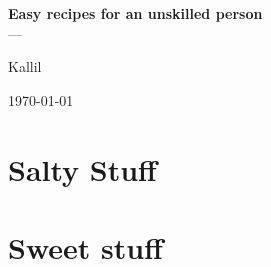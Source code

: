 \documentclass[a4paper, 12pt]{article}
\begin{document}

\begin{titlepage}
	\begin{center}
	

		\textbf{\Large{Easy recipes for an unskilled person}}\\
		\large{---}\\ 
		\vspace{15pt}
        \vspace{95pt}
		\vspace{3,5cm}
	\end{center}
	
	\begin{flushleft}
		\begin{tabbing}
			Kallil\\
	\end{tabbing}
 \end{flushleft}
	\vspace{1cm}
	
	\begin{center}
		\vspace{\fill}
			\today
			\end{center}
\end{titlepage}


\newpage
\tableofcontents
\thispagestyle{empty}

\newpage
{}
\section{Salty Stuff}


\newpage
\section{Sweet stuff}
\end{document}
